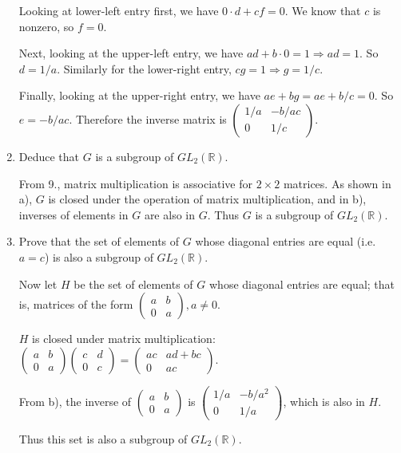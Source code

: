 \documentclass{article}
\begin{document}
\begin{enumerate}[label=(\alph*)]
          Looking at lower-left entry first, we have $0 \cdot d + cf = 0$. We know that $c$ is nonzero, so $f = 0$.

          Next, looking at the upper-left entry, we have $ad + b \cdot 0 = 1 \Rightarrow ad = 1$. So $d = 1/a$. Similarly for the lower-right entry, $cg = 1 \Rightarrow g = 1/c$.

          Finally, looking at the upper-right entry, we have $ae + bg = ae + b/c = 0$. So $e = -b/ac$. Therefore the inverse matrix is $\begin{pmatrix}1/a & -b/ac \\ 0 & 1/c\end{pmatrix}$.

    \item Deduce that $G$ is a subgroup of $GL_2(\mathbb{R})$.

          From 9., matrix multiplication is associative for $2 \times 2$ matrices. As shown in a), $G$ is closed under the operation of matrix multiplication, and in b), inverses of elements in $G$ are also in $G$. Thus $G$ is a subgroup of $GL_2(\mathbb{R})$.

    \item Prove that the set of elements of $G$ whose diagonal entries are equal (i.e. $a = c$) is also a subgroup of $GL_2(\mathbb{R})$.

          Now let $H$ be the set of elements of $G$ whose diagonal entries are equal; that is, matrices of the form $\begin{pmatrix}a & b \\ 0 & a\end{pmatrix}, a \neq 0$.

          $H$ is closed under matrix multiplication: \newline $\begin{pmatrix}a & b \\ 0 & a\end{pmatrix}\begin{pmatrix}c & d \\ 0 & c\end{pmatrix} = \begin{pmatrix}ac & ad + bc \\ 0 & ac\end{pmatrix}$.

          From b), the inverse of $\begin{pmatrix}a & b \\ 0 & a\end{pmatrix}$ is $\begin{pmatrix}1/a & -b/a^2 \\ 0 & 1/a\end{pmatrix}$, which is also in $H$.

          Thus this set is also a subgroup of $GL_2(\mathbb{R})$.
\end{enumerate}
\end{document}
